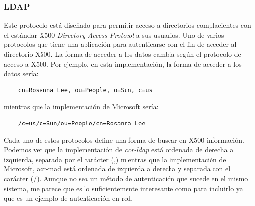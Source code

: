 \documentclass[twoside, titlepage, 12pt, a4paper]{article}
\begin{document}
\subsubsection{\gls{LDAP}}
Este protocolo está diseñado para permitir acceso a directorios complacientes con el estándar \gls{X500} \textit{Directory Access Protocol} a sus usuarios. Uno de varios protocolos que tiene una aplicación para autenticarse con el fin de acceder al directorio \gls{X500}\cite{LDAP}. La forma de acceder a los datos cambia según el protocolo de acceso a \gls{X500}. Por ejemplo, en esta implementación, la forma de acceder a los datos sería:
\begin{lstlisting}
	cn=Rosanna Lee, ou=People, o=Sun, c=us
\end{lstlisting}
mientras que la implementación de Microsoft sería:
\begin{lstlisting}
	/c=us/o=Sun/ou=People/cn=Rosanna Lee
\end{lstlisting}
Cada uno de estos protocolos define una forma de buscar en \gls{X500} información. Podemos ver que la implementación de \textit{\gls{acr-ldap}} está ordenada de derecha a izquierda, separada por el carácter (,) mientras que la implementación de Microsoft, \gls{acr-mad} está ordenada de izquierda a derecha y separada con el carácter (/).
Aunque no sea un método de autenticación que sucede en el mismo sistema, me parece que es lo suficientemente interesante como para incluirlo ya que es un ejemplo de autenticación en red.
\end{document}
